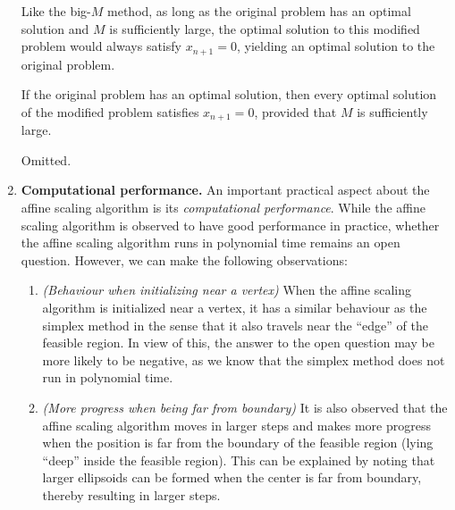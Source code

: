 \begin{enumerate}
Like the big-\(M\) method, as long as the original problem has an optimal
solution and \(M\) is sufficiently large, the optimal solution to this
modified problem would always satisfy \(x_{n+1}=0\), yielding an optimal
solution to the original problem.

\begin{proposition}
\label{prp:affine-scal-big-m}
If the original problem has an optimal solution, then every optimal solution
of the modified problem satisfies \(x_{n+1}=0\), provided that \(M\) is
sufficiently large.
\end{proposition}
\begin{pf}
Omitted.
\end{pf}
\item \textbf{Computational performance.} An important practical aspect about
the affine scaling algorithm is its \emph{computational performance}.  While
the affine scaling algorithm is observed to have good performance in practice,
whether the affine scaling algorithm runs in polynomial time remains an open
question. However, we can make the following observations:
\begin{enumerate}
\item \emph{(Behaviour when initializing near a vertex)}
When the affine scaling algorithm is initialized near a vertex, it has a
similar behaviour as the simplex method in the sense that it also travels near
the ``edge'' of the feasible region. In view of this, the answer to the open
question may be more likely to be negative, as we know that the simplex method
does not run in polynomial time.
\item\label{it:more-prog-far-from-bound} \emph{(More progress when being far
from boundary)} It is also observed that the affine scaling algorithm moves in
larger steps and makes more progress when the position is far from the boundary
of the feasible region (lying ``deep'' inside the feasible region). This can be
explained by noting that larger ellipsoids can be formed when the center is far
from boundary, thereby resulting in larger steps.
\end{enumerate}
\end{enumerate}
